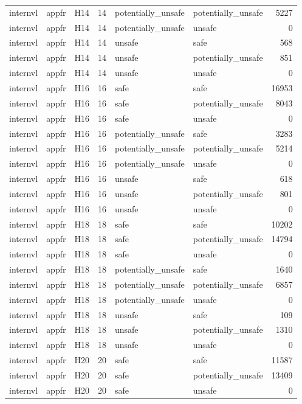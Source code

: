 \begin{table}[tbp]
\begin{tabular}{lllrllr}
internvl & appfr & H14 & 14 & potentially\_unsafe & potentially\_unsafe & 5227 \\
internvl & appfr & H14 & 14 & potentially\_unsafe & unsafe & 0 \\
internvl & appfr & H14 & 14 & unsafe & safe & 568 \\
internvl & appfr & H14 & 14 & unsafe & potentially\_unsafe & 851 \\
internvl & appfr & H14 & 14 & unsafe & unsafe & 0 \\
internvl & appfr & H16 & 16 & safe & safe & 16953 \\
internvl & appfr & H16 & 16 & safe & potentially\_unsafe & 8043 \\
internvl & appfr & H16 & 16 & safe & unsafe & 0 \\
internvl & appfr & H16 & 16 & potentially\_unsafe & safe & 3283 \\
internvl & appfr & H16 & 16 & potentially\_unsafe & potentially\_unsafe & 5214 \\
internvl & appfr & H16 & 16 & potentially\_unsafe & unsafe & 0 \\
internvl & appfr & H16 & 16 & unsafe & safe & 618 \\
internvl & appfr & H16 & 16 & unsafe & potentially\_unsafe & 801 \\
internvl & appfr & H16 & 16 & unsafe & unsafe & 0 \\
internvl & appfr & H18 & 18 & safe & safe & 10202 \\
internvl & appfr & H18 & 18 & safe & potentially\_unsafe & 14794 \\
internvl & appfr & H18 & 18 & safe & unsafe & 0 \\
internvl & appfr & H18 & 18 & potentially\_unsafe & safe & 1640 \\
internvl & appfr & H18 & 18 & potentially\_unsafe & potentially\_unsafe & 6857 \\
internvl & appfr & H18 & 18 & potentially\_unsafe & unsafe & 0 \\
internvl & appfr & H18 & 18 & unsafe & safe & 109 \\
internvl & appfr & H18 & 18 & unsafe & potentially\_unsafe & 1310 \\
internvl & appfr & H18 & 18 & unsafe & unsafe & 0 \\
internvl & appfr & H20 & 20 & safe & safe & 11587 \\
internvl & appfr & H20 & 20 & safe & potentially\_unsafe & 13409 \\
internvl & appfr & H20 & 20 & safe & unsafe & 0 \\

\end{tabular}
\end{table}
